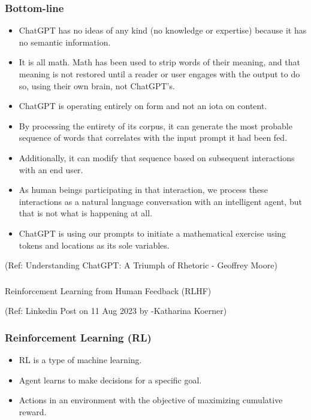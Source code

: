 \begin{frame}[fragile]\frametitle{Bottom-line}

\begin{itemize}
\item ChatGPT has no ideas of any kind (no knowledge or expertise) because it has no semantic information. 
\item It is all math. Math has been used to strip words of their meaning, and that meaning is not restored until a reader or user engages with the output to do so, using their own brain, not ChatGPT’s. 
\item ChatGPT is operating entirely on form and not an iota on content. 
\item By processing the entirety of its corpus, it can generate the most probable sequence of words that correlates with the input prompt it had been fed. 
\item Additionally, it can modify that sequence based on subsequent interactions with an end user. 
\item As human beings participating in that interaction, we process these interactions as a natural language conversation with an intelligent agent, but that is not what is happening at all. 
\item ChatGPT is using our prompts to initiate a mathematical exercise using tokens and locations as its sole variables. 
\end{itemize}


{\tiny (Ref: Understanding ChatGPT: A Triumph of Rhetoric - Geoffrey Moore)}

\end{frame}



\begin{frame}[fragile]\frametitle{}
\begin{center}
{\Large Reinforcement Learning from Human Feedback (RLHF)}

{\tiny (Ref: Linkedin Post on 11 Aug 2023 by -Katharina Koerner)}

\end{center}
\end{frame}

\begin{frame}[fragile]\frametitle{Reinforcement Learning (RL)}
\begin{itemize}
    \item RL is a type of machine learning.
    \item Agent learns to make decisions for a specific goal.
    \item Actions in an environment with the objective of maximizing cumulative reward.
\end{itemize}
\end{frame}

